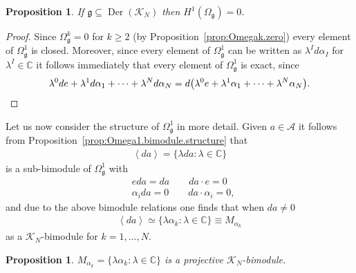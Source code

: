 \documentclass{amsart}
\newcommand{\complex}{\mathbb{C}}
\newcommand{\angles}[1]{\left\langle #1 \right\rangle}
\newcommand{\paraa}[1]{\big(#1\big)}
\newtheorem{proposition}[theorem]{Proposition}
\theoremstyle{definition}
\theoremstyle{remark}
\numberwithin{equation}{section}
\newcommand{\A}{\mathcal{A}}
\newcommand{\K}{\mathcal{K}}
\newcommand{\KN}{\K_N}
\newcommand{\Der}{\operatorname{Der}}
\newcommand{\g}{\mathfrak{g}}
\newcommand{\Omegag}[1]{\Omega^{#1}_{\g}}
\newcommand{\Omegaoneg}{\Omega^1_{\g}}
\begin{document}
\begin{proposition}
  If $\g\subseteq\Der(\KN)$ then $H^1(\Omegag{})=0$.
\end{proposition}

\begin{proof}
  Since $\Omegag{k}=0$ for $k\geq 2$ (by
  Proposition~\ref{prop:Omegak.zero}) every element of $\Omegag{1}$ is
  closed. Moreover, since every element of $\Omegag{1}$ can be written
  as $\lambda^Id\alpha_I$ for $\lambda^I\in\complex$  it follows immediately that
  every element of $\Omegag{1}$ is exact, since
  \begin{equation*}
    \lambda^0de + \lambda^1d\alpha_1+\cdots+\lambda^Nd\alpha_N
    =d\paraa{\lambda^0e + \lambda^1\alpha_1+\cdots+\lambda^N\alpha_N}.\qedhere
  \end{equation*}
\end{proof}

\noindent
Let us now consider the structure of $\Omegaoneg$ in more detail.
Given $a\in\A$ it follows from
Proposition~\ref{prop:Omega1.bimodule.structure} that
\begin{align*}
  \angles{da} = \{\lambda da:\lambda\in\complex\}
\end{align*}
is a sub-bimodule of $\Omegag{1}$ with
\begin{equation}\label{eq:da.module.relations}
  \begin{split}
    &e da = da\qquad da\cdot e = 0\\
    &\alpha_ida = 0 \qquad da\cdot \alpha_i =0,
  \end{split}
\end{equation}
and due to the above bimodule relations one finds that when $da\neq 0$
\begin{align*}
  \angles{da}\simeq\{\lambda\alpha_k:\lambda\in\complex\}
  \equiv M_{\alpha_k}
\end{align*}
as a $\KN$-bimodule for $k=1,\ldots,N$.

\begin{proposition}\label{prop:Malphak.projective.bimodule}
  $M_{\alpha_k}=\{\lambda\alpha_k:\lambda\in\complex\}$ is a
  projective $\KN$-bimodule.
\end{proposition}
\end{document}
